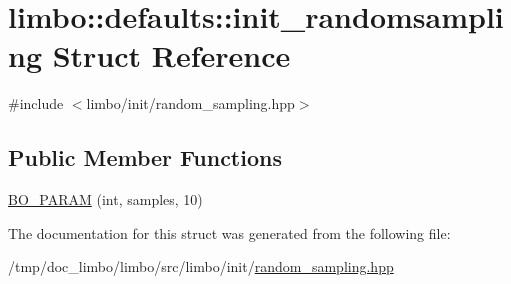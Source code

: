 \hypertarget{structlimbo_1_1defaults_1_1init__randomsampling}{}\section{limbo\+:\+:defaults\+:\+:init\+\_\+randomsampling Struct Reference}
\label{structlimbo_1_1defaults_1_1init__randomsampling}


{\ttfamily \#include $<$limbo/init/random\+\_\+sampling.\+hpp$>$}

\subsection*{Public Member Functions}
\begin{DoxyCompactItemize}
\item 
\hyperlink{group__init__defaults_ga74c4af5541464b6d880589e40dddfd54}{B\+O\+\_\+\+P\+A\+R\+A\+M} (int, samples, 10)
\end{DoxyCompactItemize}


The documentation for this struct was generated from the following file\+:\begin{DoxyCompactItemize}
\item 
/tmp/doc\+\_\+limbo/limbo/src/limbo/init/\hyperlink{random__sampling_8hpp}{random\+\_\+sampling.\+hpp}\end{DoxyCompactItemize}
